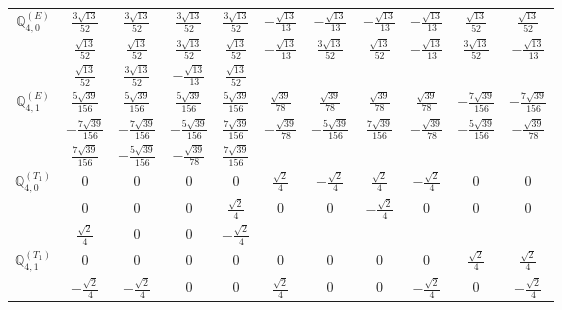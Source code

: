 \documentclass[fleqn,10pt,landscape]{article}
\begin{document}
\begin{itemize}
{\begin{center}
\begin{longtable}{ccccccccccc}
$\mathbb{Q}_{4,0}^{(E)}$ & $ \frac{3 \sqrt{13}}{52} $ & $ \frac{3 \sqrt{13}}{52} $ & $ \frac{3 \sqrt{13}}{52} $ & $ \frac{3 \sqrt{13}}{52} $ & $ - \frac{\sqrt{13}}{13} $ & $ - \frac{\sqrt{13}}{13} $ & $ - \frac{\sqrt{13}}{13} $ & $ - \frac{\sqrt{13}}{13} $ & $ \frac{\sqrt{13}}{52} $ & $ \frac{\sqrt{13}}{52} $ \\
& $ \frac{\sqrt{13}}{52} $ & $ \frac{\sqrt{13}}{52} $ & $ \frac{3 \sqrt{13}}{52} $ & $ \frac{\sqrt{13}}{52} $ & $ - \frac{\sqrt{13}}{13} $ & $ \frac{3 \sqrt{13}}{52} $ & $ \frac{\sqrt{13}}{52} $ & $ - \frac{\sqrt{13}}{13} $ & $ \frac{3 \sqrt{13}}{52} $ & $ - \frac{\sqrt{13}}{13} $ \\
& $ \frac{\sqrt{13}}{52} $ & $ \frac{3 \sqrt{13}}{52} $ & $ - \frac{\sqrt{13}}{13} $ & $ \frac{\sqrt{13}}{52} $ & $  $ & $  $ & $  $ & $  $ & $  $ & $  $ \\ \hline
$\mathbb{Q}_{4,1}^{(E)}$ & $ \frac{5 \sqrt{39}}{156} $ & $ \frac{5 \sqrt{39}}{156} $ & $ \frac{5 \sqrt{39}}{156} $ & $ \frac{5 \sqrt{39}}{156} $ & $ \frac{\sqrt{39}}{78} $ & $ \frac{\sqrt{39}}{78} $ & $ \frac{\sqrt{39}}{78} $ & $ \frac{\sqrt{39}}{78} $ & $ - \frac{7 \sqrt{39}}{156} $ & $ - \frac{7 \sqrt{39}}{156} $ \\
& $ - \frac{7 \sqrt{39}}{156} $ & $ - \frac{7 \sqrt{39}}{156} $ & $ - \frac{5 \sqrt{39}}{156} $ & $ \frac{7 \sqrt{39}}{156} $ & $ - \frac{\sqrt{39}}{78} $ & $ - \frac{5 \sqrt{39}}{156} $ & $ \frac{7 \sqrt{39}}{156} $ & $ - \frac{\sqrt{39}}{78} $ & $ - \frac{5 \sqrt{39}}{156} $ & $ - \frac{\sqrt{39}}{78} $ \\
& $ \frac{7 \sqrt{39}}{156} $ & $ - \frac{5 \sqrt{39}}{156} $ & $ - \frac{\sqrt{39}}{78} $ & $ \frac{7 \sqrt{39}}{156} $ & $  $ & $  $ & $  $ & $  $ & $  $ & $  $ \\ \hline
$\mathbb{Q}_{4,0}^{(T_{1})}$ & $ 0 $ & $ 0 $ & $ 0 $ & $ 0 $ & $ \frac{\sqrt{2}}{4} $ & $ - \frac{\sqrt{2}}{4} $ & $ \frac{\sqrt{2}}{4} $ & $ - \frac{\sqrt{2}}{4} $ & $ 0 $ & $ 0 $ \\
& $ 0 $ & $ 0 $ & $ 0 $ & $ \frac{\sqrt{2}}{4} $ & $ 0 $ & $ 0 $ & $ - \frac{\sqrt{2}}{4} $ & $ 0 $ & $ 0 $ & $ 0 $ \\
& $ \frac{\sqrt{2}}{4} $ & $ 0 $ & $ 0 $ & $ - \frac{\sqrt{2}}{4} $ & $  $ & $  $ & $  $ & $  $ & $  $ & $  $ \\ \hline
$\mathbb{Q}_{4,1}^{(T_{1})}$ & $ 0 $ & $ 0 $ & $ 0 $ & $ 0 $ & $ 0 $ & $ 0 $ & $ 0 $ & $ 0 $ & $ \frac{\sqrt{2}}{4} $ & $ \frac{\sqrt{2}}{4} $ \\
& $ - \frac{\sqrt{2}}{4} $ & $ - \frac{\sqrt{2}}{4} $ & $ 0 $ & $ 0 $ & $ \frac{\sqrt{2}}{4} $ & $ 0 $ & $ 0 $ & $ - \frac{\sqrt{2}}{4} $ & $ 0 $ & $ - \frac{\sqrt{2}}{4} $ \\

\end{longtable}
\end{center}}
\end{itemize}
\end{document}
